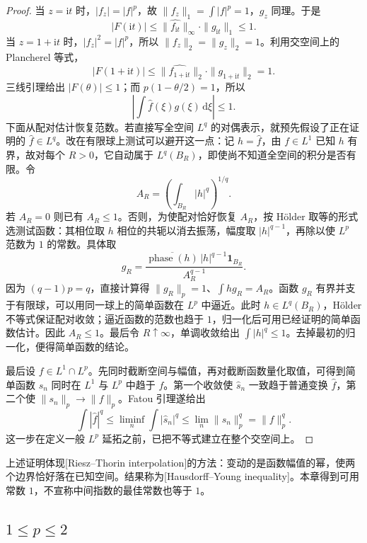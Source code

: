 \begin{proof}
当 \(z=\mathrm{i}t\) 时，\(|f_z|=|f|^p\)，故 \(\|f_z\|_1=\int|f|^p=1\)，\(g_z\) 同理。于是
\[
 |F(\mathrm{i}t)|\leq\|\widehat {f_{\mathrm{i}t}}\|_\infty\cdot\|g_{\mathrm{i}t}\|_1\leq1.
\]
当 \(z=1+\mathrm{i}t\) 时，\(|f_z|^2=|f|^p\)，所以 \(\|f_z\|_2=\|g_z\|_2=1\)。利用交空间上的 Plancherel 等式，
\[
 |F(1+\mathrm{i}t)|\leq\|\widehat {f_{1+\mathrm{i}t}}\|_2\cdot\|g_{1+\mathrm{i}t}\|_2=1.
\]
三线引理给出 \(|F(\theta)|\leq1\)；而 \(p(1-\theta/2)=1\)，所以
\[
 \left|\int\widehat f(\xi)g(\xi)\,\mathrm{d}\xi\right|\leq1.
\]
下面从配对估计恢复范数。若直接写全空间 \(L^q\) 的对偶表示，就预先假设了正在证明的 \(\widehat f\in L^q\)。改在有限球上测试可以避开这一点：记 \(h=\widehat f\)，由 \(f\in L^1\) 已知 \(h\) 有界，故对每个 \(R>0\)，它自动属于 \(L^q(B_R)\)，即使尚不知道全空间的积分是否有限。令
\[
 A_R=\left(\int_{B_R}|h|^q\right)^{1/q}.
\]
若 \(A_R=0\) 则已有 \(A_R\leq1\)。否则，为使配对恰好恢复 \(A_R\)，按 Hölder 取等的形式选测试函数：其相位取 \(h\) 相位的共轭以消去振荡，幅度取 \(|h|^{q-1}\)，再除以使 \(L^p\) 范数为 \(1\) 的常数。具体取
\[
 g_R=\frac{\overline{\operatorname{phase}(h)}\,|h|^{q-1}\mathbf1_{B_R}}{A_R^{q-1}}.
\]
因为 \((q-1)p=q\)，直接计算得 \(\|g_R\|_p=1\)、\(\int hg_R=A_R\)。函数 \(g_R\) 有界并支于有限球，可以用同一球上的简单函数在 \(L^p\) 中逼近。此时 \(h\in L^q(B_R)\)，Hölder 不等式保证配对收敛；逼近函数的范数也趋于 \(1\)，归一化后可用已经证明的简单函数估计。因此 \(A_R\leq1\)。最后令 \(R\uparrow\infty\)，单调收敛给出 \(\int|h|^q\leq1\)。去掉最初的归一化，便得简单函数的结论。

最后设 \(f\in L^1\cap L^p\)。先同时截断空间与幅值，再对截断函数量化取值，可得到简单函数 \(s_n\) 同时在 \(L^1\) 与 \(L^p\) 中趋于 \(f\)。第一个收敛使 \(\widehat s_n\) 一致趋于普通变换 \(\widehat f\)，第二个使 \(\|s_n\|_p\to\|f\|_p\)。Fatou 引理遂给出
\[
 \int|\widehat f|^q\leq\liminf_n\int|\widehat s_n|^q
 \leq\lim_n\|s_n\|_p^q=\|f\|_p^q.
\]
这一步在定义一般 \(L^p\) 延拓之前，已把不等式建立在整个交空间上。
\end{proof}

上述证明体现[Riesz--Thorin interpolation]的方法：变动的是函数幅值的幂，使两个边界恰好落在已知空间。结果称为[Hausdorff--Young inequality]。本章得到可用常数 \(1\)，不宣称中间指数的最佳常数也等于 \(1\)。

\subsection{\texorpdfstring{\(1\leq p\leq2\)}{1≤p≤2}}
\label{b2:subsec:04-lp-fourier-extension}
\label{b2:subsec:040204}

